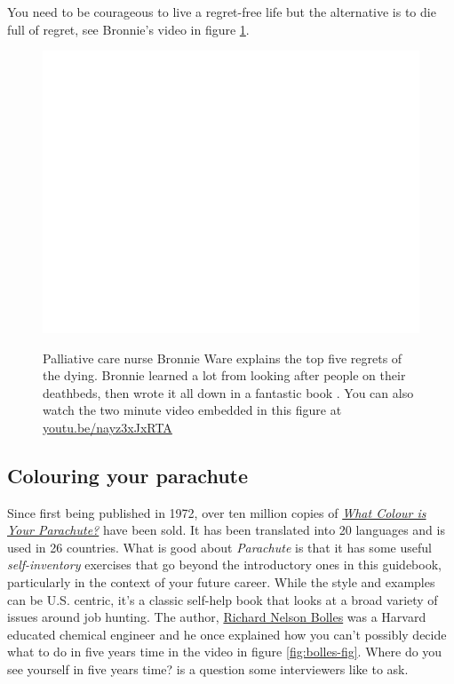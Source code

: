\documentclass[
]{book}
\begin{document}
You need to be courageous to live a regret-free life but the alternative is to die full of regret, see Bronnie's video in figure \ref{fig:bronnie-fig}.

\begin{figure}

{\centering \href{https://www.youtube.com/embed/nayz3xJxRTA}{\includegraphics[width=0.99\linewidth]{cdyf_files/figure-latex/bronnie-fig-1} }

}

\caption{Palliative care nurse Bronnie Ware explains the top five regrets of the dying. Bronnie learned a lot from looking after people on their deathbeds, then wrote it all down in a fantastic book \citep{regrets}. You can also watch the two minute video embedded in this figure at \href{https://youtu.be/nayz3xJxRTA}{youtu.be/nayz3xJxRTA} \citep{youtube-bronnie}}\label{fig:bronnie-fig}
\end{figure}



\hypertarget{parachute}{%
\subsection{Colouring your parachute}\label{parachute}}

Since first being published in 1972, over ten million copies of \emph{\href{https://en.wikipedia.org/wiki/What_Color_is_Your_Parachute\%3F}{What Colour is Your Parachute?}} have been sold. It has been translated into 20 languages and is used in 26 countries. What is good about \emph{Parachute} is that it has some useful \emph{self-inventory} exercises that go beyond the introductory ones in this guidebook, particularly in the context of your future career. While the style and examples can be U.S. centric, it's a classic self-help book that looks at a broad variety of issues around job hunting. The author, \href{https://en.wikipedia.org/wiki/Richard_Nelson_Bolles}{Richard Nelson Bolles} was a Harvard educated chemical engineer and he once explained how you can't possibly decide what to do in five years time in the video in figure \ref{fig:bolles-fig}. Where do you see yourself in five years time? is a question some interviewers like to ask.
\end{document}
